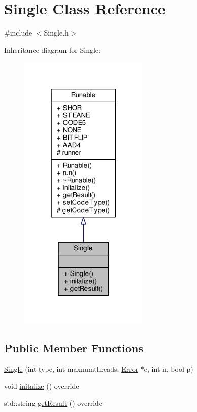 \hypertarget{class_single}{}\section{Single Class Reference}
\label{class_single}


{\ttfamily \#include $<$Single.\+h$>$}



Inheritance diagram for Single\+:\nopagebreak
\begin{figure}[H]
\begin{center}
\leavevmode
\includegraphics[width=175pt]{class_single__inherit__graph}
\end{center}
\end{figure}
\subsection*{Public Member Functions}
\begin{DoxyCompactItemize}
\item 
\hyperlink{class_single_a33c1f42b4d433ed679f69d96664facb6}{Single} (int type, int maxnumthreads, \hyperlink{class_error}{Error} $\ast$e, int n, bool p)
\item 
void \hyperlink{class_single_afa7dc40314a46c75553a1de77ce020e9}{initalize} () override
\item 
std\+::string \hyperlink{class_single_adcafbbcea43758d47c2f8b4e0704c8dd}{get\+Result} () override
\end{DoxyCompactItemize}
